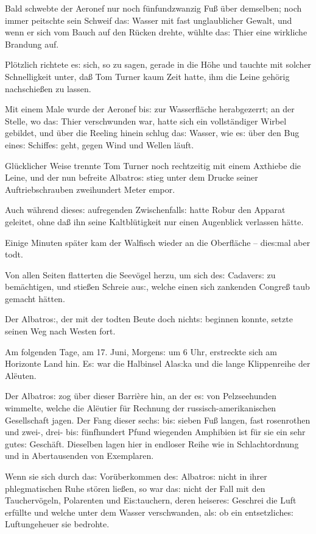 \documentclass[oneside,12pt]{book}
\newcommand{\s}{s:}
\begin{document}
Bald schwebte der Aeronef nur noch f\"unfundzwanzig Fu{\ss} \"uber
demselben; noch immer peitschte sein Schweif da{\s} Wasser mit fast
unglaublicher Gewalt, und wenn er sich vom Bauch auf den R\"ucken
drehte, w\"uhlte da{\s} Thier eine wirkliche Brandung auf.

Pl\"otzlich richtete e{\s} sich, so zu sagen, gerade in die H\"ohe
und tauchte mit solcher Schnelligkeit unter, da{\ss} Tom Turner kaum
Zeit hatte, ihm die Leine geh\"orig nachschie{\ss}en zu lassen.

Mit einem Male wurde der Aeronef bi{\s} zur Wasserfl\"ache
herabgezerrt; an der Stelle, wo da{\s} Thier verschwunden war, hatte
sich ein vollst\"andiger Wirbel gebildet, und \"uber die Reeling
hinein schlug da{\s} Wasser, wie e{\s} \"uber den Bug eine{\s}
Schiffe{\s} geht, gegen Wind und Wellen l\"auft.

Gl\"ucklicher Weise trennte Tom Turner noch recht\/zeitig mit einem
Axthiebe die Leine, und der nun befreite {\glqq}Albatro{\s}{\grqq}
stieg unter dem Drucke seiner Auftriebschrauben zweihundert Meter
empor.

Auch w\"ahrend diese{\s} aufregenden Zwischenfall{\s} hatte Robur den
Apparat geleitet, ohne da{\ss} ihn seine Kaltbl\"utigkeit nur einen
Augenblick verlassen h\"atte.

Einige Minuten sp\"ater kam der Walfisch wieder an die Oberfl\"ache
-- die{\s}mal aber todt.

Von allen Seiten flatterten die Seev\"ogel herzu, um sich de{\s}
Cadaver{\s} zu bem\"achtigen, und stie{\ss}en Schreie au{\s}, welche
einen sich zankenden Congre{\ss} taub gemacht h\"atten.

Der {\glqq}Albatro{\s}{\grqq}, der mit der todten Beute doch
nicht{\s} beginnen konnte, setzte seinen Weg nach Westen fort.

Am folgenden Tage, am 17. Juni, Morgen{\s} um 6 Uhr, erstreckte sich
am Horizonte Land hin. E{\s} war die Halbinsel Ala{\s}ka und die
lange Klippenreihe der Al\"euten.

Der {\glqq}Albatro{\s}{\grqq} zog \"uber dieser Barri\`ere hin, an
der e{\s} von Pelzseehunden wimmelte, welche die Al\"eutier f\"ur
Rechnung der russisch-amerikanischen Gesellschaft jagen. Der Fang
dieser sech{\s} bi{\s} sieben Fu{\ss} langen, fast rosenrothen und
zwei-, drei- bi{\s} f\"unfhundert Pfund wiegenden Amphibien ist f\"ur
sie ein sehr gute{\s} Gesch\"aft. Dieselben lagen hier in endloser
Reihe wie in Schlachtordnung und in Abertausenden von Exemplaren.

Wenn sie sich durch da{\s} Vor\"uberkommen de{\s}
{\glqq}Albatro{\s}{\grqq} nicht in ihrer phlegmatischen Ruhe st\"oren
lie{\ss}en, so war da{\s} nicht der Fall mit den Taucherv\"ogeln,
Polarenten und Ei{\s}tauchern, deren heisere{\s} Geschrei die Luft
erf\"ullte und welche unter dem Wasser verschwanden, al{\s} ob ein
entsetzliche{\s} Luftungeheuer sie bedrohte.
\end{document}
